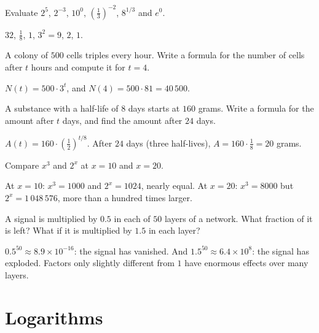 \sectionexercises

\begin{exercise}
Evaluate $2^5$, $2^{-3}$, $10^0$, $\left(\tfrac13\right)^{-2}$, $8^{1/3}$ and
$e^0$.
\end{exercise}
\begin{solution}
$32$, $\tfrac18$, $1$, $3^2 = 9$, $2$, $1$.
\end{solution}

\begin{exercise}
A colony of $500$ cells triples every hour. Write a formula for the number of
cells after $t$ hours and compute it for $t = 4$.
\end{exercise}
\begin{solution}
$N(t) = 500 \cdot 3^t$, and $N(4) = 500 \cdot 81 = 40\,500$.
\end{solution}

\begin{exercise}
A substance with a half-life of $8$ days starts at $160$ grams. Write a
formula for the amount after $t$ days, and find the amount after $24$ days.
\end{exercise}
\begin{solution}
$A(t) = 160 \cdot \left(\tfrac12\right)^{t/8}$. After $24$ days (three
half-lives), $A = 160 \cdot \tfrac18 = 20$ grams.
\end{solution}

\begin{exercise}
Compare $x^3$ and $2^x$ at $x = 10$ and $x = 20$.
\end{exercise}
\begin{solution}
At $x = 10$: $x^3 = 1000$ and $2^x = 1024$, nearly equal. At $x = 20$:
$x^3 = 8000$ but $2^x = 1\,048\,576$, more than a hundred times larger.
\end{solution}

\begin{exercise}
A signal is multiplied by $0.5$ in each of $50$ layers of a network. What
fraction of it is left? What if it is multiplied by $1.5$ in each layer?
\end{exercise}
\begin{solution}
$0.5^{50} \approx 8.9\times10^{-16}$: the signal has vanished. And
$1.5^{50} \approx 6.4 \times 10^{8}$: the signal has exploded. Factors only
slightly different from $1$ have enormous effects over many layers.
\end{solution}

\section{Logarithms}\label{sec:logarithms}

